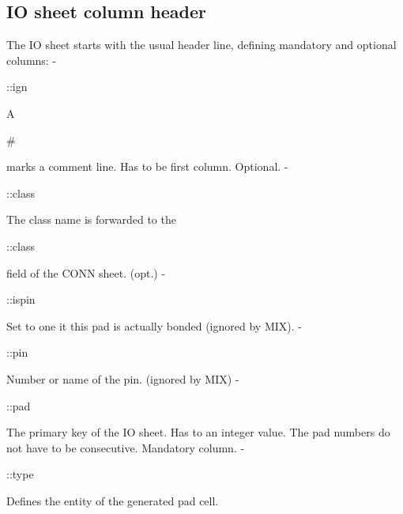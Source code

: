 \documentclass[a4paper,12pt]{article}
\begin{document}
\subsection{IO sheet column header}
The IO sheet starts with the usual header line, defining mandatory and optional columns:\newline
\hspace*{4mm}-\hspace*{4mm}\begin{tt}::ign\end{tt}\hspace*{9mm}A \begin{tt}\#\end{tt} marks a comment line. Has to be first column. Optional.\newline
\hspace*{4mm}-\hspace*{4mm}\begin{tt}::class\end{tt}\hspace*{4mm}The class name is forwarded to the \begin{tt}::class\end{tt} field of the CONN sheet. (opt.)\newline
\hspace*{4mm}-\hspace*{4mm}\begin{tt}::ispin\end{tt}\hspace*{4mm}Set to one it this pad is actually bonded (ignored by MIX).\newline
\hspace*{4mm}-\hspace*{4mm}\begin{tt}::pin\end{tt}\hspace*{8mm}Number or name of the pin. (ignored by MIX)\newline
\hspace*{4mm}-\hspace*{4mm}\begin{tt}::pad\end{tt}\hspace*{8mm}The primary key of the IO sheet. Has to an integer value. The pad\newline
\hspace*{32mm}numbers do not have to be consecutive. Mandatory column.\newline
\hspace*{4mm}-\hspace*{4mm}\begin{tt}::type\end{tt}\hspace*{7mm}Defines the entity of the generated pad cell.\newline
\end{document}
